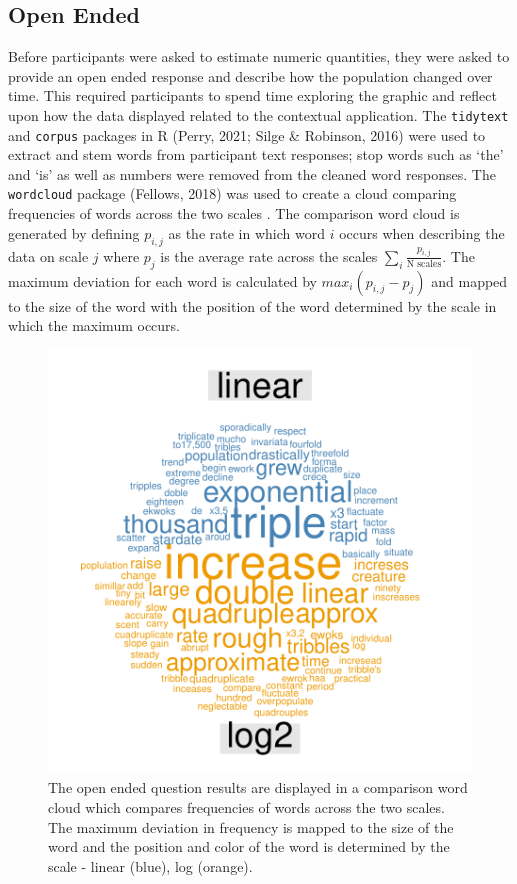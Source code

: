 \documentclass[print]{nuthesis}
\begin{document}
\hypertarget{open-ended}{%
\subsection{Open Ended}\label{open-ended}}

Before participants were asked to estimate numeric quantities, they were asked to provide an open ended response and describe how the population changed over time.
This required participants to spend time exploring the graphic and reflect upon how the data displayed related to the contextual application.
The \texttt{tidytext} and \texttt{corpus} packages in R (Perry, 2021; Silge \& Robinson, 2016) were used to extract and stem words from participant text responses; stop words such as `the' and `is' as well as numbers were removed from the cleaned word responses.
The \texttt{wordcloud} package (Fellows, 2018) was used to create a cloud comparing frequencies of words across the two scales .
The comparison word cloud is generated by defining \(p_{i,j}\) as the rate in which word \(i\) occurs when describing the data on scale \(j\) where \(p_j\) is the average rate across the scales \(\sum_i{\frac{p_{i,j}}{\text{N scales}}}\).
The maximum deviation for each word is calculated by \(max_i(p_{i,j} - p_j)\) and mapped to the size of the word with the position of the word determined by the scale in which the maximum occurs.

\begin{figure}[tbp]

{\centering \includegraphics[width=0.75\linewidth,]{thesis_files/figure-latex/estimation-word-cloud-1} 

}

\caption[Estimation word cloud]{The open ended question results are displayed in a comparison word cloud which compares frequencies of words across the two scales. The maximum deviation in frequency is mapped to the size of the word and the position and color of the word is determined by the scale - linear (blue), log (orange).}\label{fig:estimation-word-cloud}
\end{figure}
\end{document}
